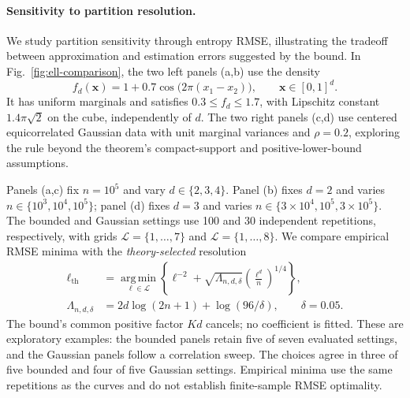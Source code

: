 
\paragraph{Sensitivity to partition resolution.}
We study partition sensitivity through entropy RMSE, illustrating the tradeoff
between approximation and estimation errors suggested by the bound.
In Fig.~\ref{fig:ell-comparison}, the two left panels (a,b) use the density
\[
f_d(\mathbf{x})=1+0.7\cos\!\bigl(2\pi(x_1-x_2)\bigr),
\qquad \mathbf{x}\in[0,1]^d.
\]
It has uniform marginals and satisfies $0.3\le f_d\le1.7$, with Lipschitz
constant $1.4\pi\sqrt{2}$ on the cube, independently of $d$.
The two right panels (c,d) use centered equicorrelated Gaussian data with
unit marginal variances and $\rho=0.2$, exploring the rule beyond the
theorem's compact-support and positive-lower-bound assumptions.

Panels (a,c) fix $n=10^5$ and vary $d\in\{2,3,4\}$.
Panel (b) fixes $d=2$ and varies $n\in\{10^3,10^4,10^5\}$;
panel (d) fixes $d=3$ and varies $n\in\{3\times10^4,10^5,3\times10^5\}$.
The bounded and Gaussian settings use 100 and 30 independent repetitions,
respectively, with grids $\mathcal{L}=\{1,\ldots,7\}$ and
$\mathcal{L}=\{1,\ldots,8\}$.
We compare empirical RMSE minima with the \emph{theory-selected} resolution
\begin{equation}
\begin{aligned}
\ell_{\mathrm{th}}
&=\underset{\ell\in\mathcal{L}}{\operatorname{arg\,min}}
\left\{\ell^{-2}+\sqrt{\Lambda_{n,d,\delta}}
\left(\frac{\ell^d}{n}\right)^{1/4}\right\},\\
\Lambda_{n,d,\delta}
&=2d\log(2n+1)+\log(96/\delta),\qquad\delta=0.05.
\end{aligned}
\label{eq:ell-comparison-selection}
\end{equation}
The bound's common positive factor $Kd$ cancels; no coefficient is fitted.
These are exploratory examples: the bounded panels retain five of seven
evaluated settings, and the Gaussian panels follow a correlation sweep.
The choices agree in three of five bounded and four of five Gaussian settings.
Empirical minima use the same repetitions as the curves and do not establish
finite-sample RMSE optimality.

